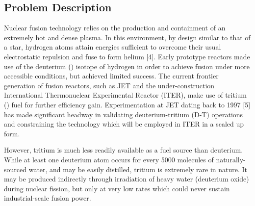 \subsection{Problem Description}
\label{sec:problemdescription}

Nuclear fusion technology relies on the production and containment of an
extremely hot and dense plasma. In this environment, by design similar to that
of a star, hydrogen atoms attain energies sufficient to overcome their usual
electrostatic repulsion and fuse to form helium [4]. Early prototype reactors
made use of the deuterium () isotope of hydrogen in order to
achieve fusion under more accessible conditions, but achieved limited success.
The current frontier generation of fusion reactors, such as JET and the
under-construction International Thermonuclear Experimental Reactor (ITER), make
use of tritium () fuel for further efficiency gain.
Experimentation at JET dating back to 1997 [5] has made significant headway in
validating deuterium-tritium (D-T) operations and constraining the technology
which will be employed in ITER in a scaled up form.

However, tritium is much less readily available as a fuel source than deuterium.
While at least one deuterium atom occurs for every 5000 molecules of
naturally-sourced water, and may be easily distilled, tritium is extremely rare
in nature. It may be produced indirectly through irradiation of heavy water
(deuterium oxide) during nuclear fission, but only at very low rates which could
never sustain industrial-scale fusion power.

